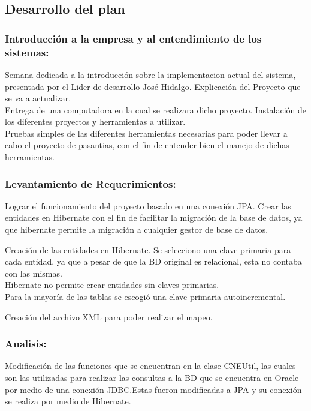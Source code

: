 \documentclass[spanish]{article}
\begin{document}
\break 
\subsection{Desarrollo del plan}
\subsubsection{Introducción a la empresa y al entendimiento de los sistemas:}
Semana dedicada a la introducción sobre la implementacion actual del sistema, presentada por el Lider de desarrollo José Hidalgo. Explicación del Proyecto que se va a actualizar. \\
Entrega de una computadora en la cual se realizara dicho proyecto.
Instalación de los diferentes proyectos y herramientas a utilizar. \\
Pruebas simples de las diferentes herramientas necesarias para poder llevar a cabo el proyecto de pasantias, con el fin de entender bien el manejo de dichas herramientas.

\subsubsection{Levantamiento de Requerimientos:}
Lograr el funcionamiento del proyecto basado en una conexión JPA. Crear las entidades en Hibernate con el fin de facilitar la migración de la base de datos, ya que hibernate permite la migración a cualquier gestor de base de datos. 

Creación de las entidades en Hibernate. Se selecciono una clave primaria para cada entidad, ya que a pesar de que la BD original es relacional, esta no contaba con las mismas. \\
Hibernate no permite crear entidades sin claves primarias. \\
 Para la mayoría de las tablas se escogió una clave primaria autoincremental.
 
Creación del archivo XML para poder realizar el mapeo. 

 
\subsubsection{Analisis:}
Modificación de las funciones que se encuentran en la clase CNEUtil, las cuales son las utilizadas para realizar las consultas a la BD que se encuentra en Oracle por medio de una conexión JDBC.Estas fueron modificadas a JPA y su conexión se realiza por medio de Hibernate. \\
\end{document}
